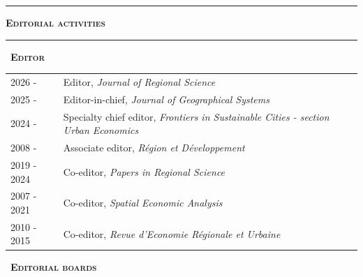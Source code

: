 \documentclass[a4paper,12pt]{article}
\newcommand{\titre}[1]{%
	\bigskip
	\noindent \rule[2mm]{\textwidth}{0.5pt}
	\textbf{\textsc{\large #1}} \\
	\noindent \rule[1mm]{\textwidth}{0.5pt}
	}
\newcommand{\smalltitre}[1]{%
	\noindent \textbullet~\textsc{\textbf{#1}}
	\smallskip
	}
\begin{document}

\titre{Editorial activities}


\smalltitre{Editor}

\noindent \begin{longtable}{@{}p{\annee}p{\texte}@{}}
2026 - & Editor, \textit{Journal of Regional Science} \\
2025 - & Editor-in-chief, \textit{Journal of Geographical Systems} \\
2024 - & Specialty chief editor, \textit{Frontiers in Sustainable Cities - section Urban Economics} \\
2008 - & Associate editor, \textit{Région et Développement} \\
2019 - 2024 & Co-editor, \textit{Papers in Regional Science} \\
2007 - 2021 & Co-editor, \textit{Spatial Economic Analysis} \\
2010 - 2015 & Co-editor, \textit{Revue d'Economie Régionale et Urbaine} \\
\end{longtable}


\smalltitre{Editorial boards}
	
\end{document}
